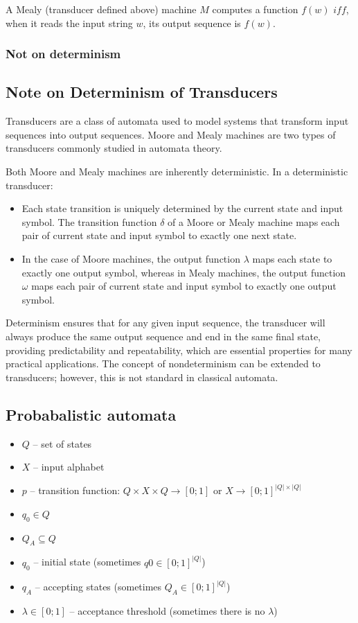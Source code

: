 \documentclass{article}
\begin{document}
A Mealy (transducer defined above) machine $M$ computes a function $f(w)$ $
iff$, when it reads the input string $w$, its output sequence is $f(w)$. 

\subsubsection{Not on determinism}


\subsection{Note on Determinism of Transducers}

Transducers are a class of automata used to model systems that transform input
sequences into output sequences. Moore and Mealy machines are two types of
transducers commonly studied in automata theory.

Both Moore and Mealy machines are inherently deterministic. In a deterministic
transducer:

\begin{itemize}
  \item Each state transition is uniquely determined by the current state and input symbol. The transition function $\delta$ of a Moore or Mealy machine maps each pair of current state and input symbol to exactly one next state.
  \item In the case of Moore machines, the output function $\lambda$ maps each state to exactly one output symbol, whereas in Mealy machines, the output function $\omega$ maps each pair of current state and input symbol to exactly one output symbol.
\end{itemize}

Determinism ensures that for any given input sequence, the transducer will
always produce the same output sequence and end in the same final state,
providing predictability and repeatability, which are essential properties for
many practical applications.
The concept of nondeterminism can be extended to transducers; however, this is not standard in classical automata.

\subsection{Probabalistic automata}

\begin{itemize}
	\item $Q$ – set of states
	\item $X$ – input alphabet
	\item $p$ – transition function: $Q \times X \times Q → [0;1]$ or $X \to {[0;1]}^{|Q|\times|Q|}$
	\item $q_0 \in Q$
	\item $Q_A \subseteq Q$
	\item $q_0$ – initial state (sometimes $q0 \in [0;1]^{|Q|}$)
	\item $q_A$ – accepting states (sometimes $Q_A ∈ [0;1]^{|Q|}$) \item $\lambda \in [0;1]$ – acceptance threshold (sometimes there is no $\lambda$) 
\end{itemize}
\end{document}

